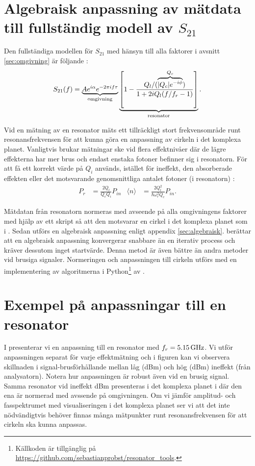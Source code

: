 \documentclass[main.tex]{subfiles}
\begin{document}
\section{Algebraisk anpassning av mätdata till fullständig modell av $S_{21}$}
\label{sec:anpass}
Den fullständiga modellen för $S_{21}$ med hänsyn till alla faktorer i avsnitt \ref{sec:omgivning} är följande \cite{Probst2015}:
\begin{equation}
    S_{21}(f)=\underbrace{A e^{i\alpha}e^{-2\pi i f\tau}}_\text{omgivning}\underbrace{\qty[1-\frac{Q_l/(\overbrace{|Q_c|e^{-i\phi}}^{Q_c})}{1+2iQ_l\qty(f/f_r-1)}]}_\text{resonator}.
\label{eq:S21}
\end{equation}

Vid en mätning av en resonator mäts ett tillräckligt stort frekvensområde runt resonansfrekvensen för att kunna göra en anpassning av cirkeln i det komplexa planet. Vanligtvis brukar mätningar ske vid flera effektnivåer där de lägre effekterna har mer brus och endast enstaka fotoner befinner sig i resonatorn. För att få ett korrekt värde på $Q_i$ används, istället för ineffekt, den absorberade effekten eller det motsvarande genomsnittliga antalet fotoner (i resonatorn) \cite{Boehme2016}:
\begin{align}
    P_r&=\frac{2Q_l}{Q_cQ_i}P_{in}
    &
    \langle n \rangle &=\frac{2Q^2_l}{\hbar \omega^2_r Q_c}P_{in}.
\end{align}

Mätdatan från resonatorn normeras med avseende på alla omgivningens faktorer med hjälp av ett skript så att den motsvarar en cirkel i det komplexa planet som i . Sedan utförs en algebraisk anpassning enligt appendix \ref{sec:algebraisk}. \citeauthor{Probst2015} \cite{Probst2015} berättar att en algebraisk anpassning konvergerar snabbare än en iterativ process och kräver dessutom inget startvärde. Denna metod är även bättre än andra metoder vid brusiga signaler. Normeringen och anpassningen till cirkeln utförs med en implementering av algoritmerna i Python\footnote{Källkoden är tillgänglig på \url{https://github.com/sebastianprobst/resonator_tools}.} av \citeauthor{Probst2015}.

\section{Exempel på anpassningar till en resonator}
I  presenterar vi en anpassning till en resonator med $f_r=\unit[5.15]{GHz}$.
Vi utför anpassningen separat för varje effektmätning och i figuren kan vi observera skillnaden i signal-brusförhållande mellan låg (\unit[-90]{dBm}) och hög  (\unit[-40]{dBm}) ineffekt (från analysatorn).
Notera hur anpassningen är robust även vid en brusig signal. Samma resonator vid ineffekt \unit[-80]{dBm} presenteras i det komplexa planet i  där den ena är normerad med avssende på omgivningen. 
Om vi jämför amplitud- och fasspektrumet med visualiseringen i det komplexa planet ser vi att det inte nödvändigtvis behöver finnas många mätpunkter runt resonansfrekvensen för att cirkeln ska kunna anpassas.
\end{document}
